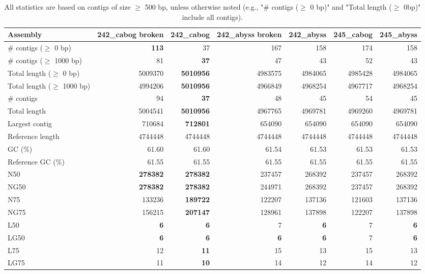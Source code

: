 \documentclass[12pt,a4paper]{article}
\begin{document}
\begin{table}[ht]
\begin{center}
\caption{All statistics are based on contigs of size $\geq$ 500 bp, unless otherwise noted (e.g., "\# contigs ($\geq$ 0 bp)" and "Total length ($\geq$ 0bp)" include all contigs).}
\begin{tabular}{|l*{6}{|r}|}
\hline
Assembly & 242\_cabog broken & 242\_cabog & 242\_abyss broken & 242\_abyss & 245\_cabog & 245\_abyss \\ \hline
\# contigs ($\geq$ 0 bp) & {\bf 113} & 37 & 167 & 158 & 174 & 158 \\ \hline
\# contigs ($\geq$ 1000 bp) & 81 & {\bf 37} & 47 & 43 & 52 & 43 \\ \hline
Total length ($\geq$ 0 bp) & 5009370 & {\bf 5010956} & 4983575 & 4984065 & 4985428 & 4984065 \\ \hline
Total length ($\geq$ 1000 bp) & 4994206 & {\bf 5010956} & 4966849 & 4968254 & 4967717 & 4968254 \\ \hline
\# contigs & 94 & {\bf 37} & 48 & 45 & 54 & 45 \\ \hline
Total length & 5004541 & {\bf 5010956} & 4967765 & 4969781 & 4969260 & 4969781 \\ \hline
Largest contig & 710684 & {\bf 712801} & 654090 & 654090 & 654090 & 654090 \\ \hline
Reference length & 4744448 & 4744448 & 4744448 & 4744448 & 4744448 & 4744448 \\ \hline
GC (\%) & 61.60 & 61.60 & 61.54 & 61.53 & 61.53 & 61.53 \\ \hline
Reference GC (\%) & 61.55 & 61.55 & 61.55 & 61.55 & 61.55 & 61.55 \\ \hline
N50 & {\bf 278382} & {\bf 278382} & 237457 & 268392 & 237457 & 268392 \\ \hline
NG50 & {\bf 278382} & {\bf 278382} & 244971 & 268392 & 237457 & 268392 \\ \hline
N75 & 133236 & {\bf 189722} & 122207 & 137136 & 121603 & 137136 \\ \hline
NG75 & 156215 & {\bf 207147} & 128961 & 137898 & 122207 & 137898 \\ \hline
L50 & {\bf 6} & {\bf 6} & 7 & {\bf 6} & 7 & {\bf 6} \\ \hline
LG50 & {\bf 6} & {\bf 6} & {\bf 6} & {\bf 6} & 7 & {\bf 6} \\ \hline
L75 & 12 & {\bf 11} & 15 & 13 & 15 & 13 \\ \hline
LG75 & 11 & {\bf 10} & 14 & 12 & 14 & 12 \\ \hline

\end{tabular}
\end{center}
\end{table}
\end{document}

